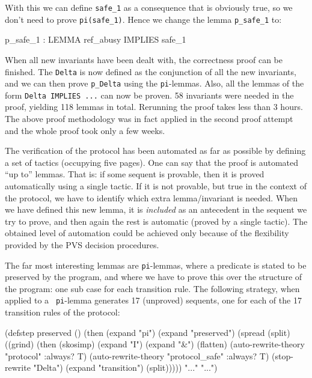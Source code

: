 With  this  we  can define {\tt  safe\_1} as  a  consequence  that  is
obviously true, so we don't need  to prove {\tt pi(safe\_1)}. Hence we
change the lemma {\tt p\_safe\_1} to:

\begin{smallsession}
  p_safe_1 : LEMMA ref_abusy IMPLIES safe_1
\end{smallsession}

When  all new invariants have been   dealt with, the correctness proof
can be finished. The {\tt Delta} is now defined  as the conjunction of
all the new invariants, and we can then prove {\tt p\_Delta} using the
{\tt pi}-lemmas.  Also, all the lemmas  of the form {\tt Delta IMPLIES
...} can  now be proven.   58 invariants  were  needed  in the  proof,
yielding 118 lemmas in  total.  Rerunning the  proof takes less than 3
hours.  The above proof methodology was in  fact applied in the second
proof attempt and the whole proof took only a few weeks.

The verification of the protocol has been automated as far as possible
by defining  a  set of  tactics (occupying five  pages).  
One can say that the proof  is automated ``up to''  lemmas.  That is: if
some  sequent is  provable, then it  is proved   automatically using a
single  tactic.  If  it  is not  provable,  but true in  the
context  of   the  protocol,   we    have to    identify  which  extra
lemma/invariant is needed.  When we have defined this new lemma, it is
{\em included} as an  antecedent in the sequent  we try to prove,  and
then again the  rest is automatic (proved by  a  single tactic).  The
obtained level of   automation could be achieved  only  because of the
flexibility provided by the PVS decision procedures.

The far most interesting lemmas are {\tt pi}-lemmas, where a predicate
is stated to be preserved by the  program, and where  we have to prove
this over  the structure  of   the program:  one  sub case   for  each
transition rule.    The following strategy,   when applied  to  a {\tt
pi}-lemma  generates 17 (unproved)  sequents, one for  each  of the 17
transition rules of the protocol:

\begin{smallsession}
  (defstep preserved ()
    (then
      (expand "pi")
      (expand "preserved")
      (spread
        (split)
        ((grind)
         (then
           (skosimp)
           (expand "I")
           (expand "&")
           (flatten)
           (auto-rewrite-theory "protocol" :always? T)
           (auto-rewrite-theory "protocol_safe" :always? T)
           (stop-rewrite "Delta")
           (expand "transition")
           (split)))))
    "..."
    "...")
\end{smallsession}

